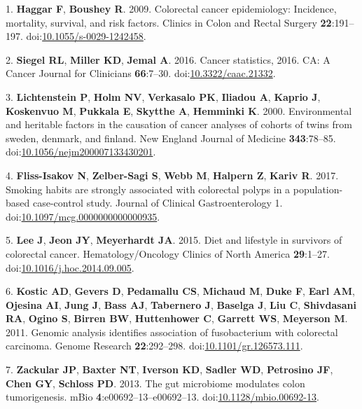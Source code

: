 \documentclass[11pt,]{article}
\begin{document}
\hypertarget{refs}{}
\hypertarget{ref-Haggar2009}{}
1. \textbf{Haggar F}, \textbf{Boushey R}. 2009. Colorectal cancer
epidemiology: Incidence, mortality, survival, and risk factors. Clinics
in Colon and Rectal Surgery \textbf{22}:191--197.
doi:\href{https://doi.org/10.1055/s-0029-1242458}{10.1055/s-0029-1242458}.

\hypertarget{ref-Siegel2016}{}
2. \textbf{Siegel RL}, \textbf{Miller KD}, \textbf{Jemal A}. 2016.
Cancer statistics, 2016. CA: A Cancer Journal for Clinicians
\textbf{66}:7--30.
doi:\href{https://doi.org/10.3322/caac.21332}{10.3322/caac.21332}.

\hypertarget{ref-Lichtenstein2000}{}
3. \textbf{Lichtenstein P}, \textbf{Holm NV}, \textbf{Verkasalo PK},
\textbf{Iliadou A}, \textbf{Kaprio J}, \textbf{Koskenvuo M},
\textbf{Pukkala E}, \textbf{Skytthe A}, \textbf{Hemminki K}. 2000.
Environmental and heritable factors in the causation of cancer analyses
of cohorts of twins from sweden, denmark, and finland. New England
Journal of Medicine \textbf{343}:78--85.
doi:\href{https://doi.org/10.1056/nejm200007133430201}{10.1056/nejm200007133430201}.

\hypertarget{ref-FlissIsakov2017}{}
4. \textbf{Fliss-Isakov N}, \textbf{Zelber-Sagi S}, \textbf{Webb M},
\textbf{Halpern Z}, \textbf{Kariv R}. 2017. Smoking habits are strongly
associated with colorectal polyps in a population-based case-control
study. Journal of Clinical Gastroenterology 1.
doi:\href{https://doi.org/10.1097/mcg.0000000000000935}{10.1097/mcg.0000000000000935}.

\hypertarget{ref-Lee2015}{}
5. \textbf{Lee J}, \textbf{Jeon JY}, \textbf{Meyerhardt JA}. 2015. Diet
and lifestyle in survivors of colorectal cancer. Hematology/Oncology
Clinics of North America \textbf{29}:1--27.
doi:\href{https://doi.org/10.1016/j.hoc.2014.09.005}{10.1016/j.hoc.2014.09.005}.

\hypertarget{ref-Kostic2011}{}
6. \textbf{Kostic AD}, \textbf{Gevers D}, \textbf{Pedamallu CS},
\textbf{Michaud M}, \textbf{Duke F}, \textbf{Earl AM}, \textbf{Ojesina
AI}, \textbf{Jung J}, \textbf{Bass AJ}, \textbf{Tabernero J},
\textbf{Baselga J}, \textbf{Liu C}, \textbf{Shivdasani RA},
\textbf{Ogino S}, \textbf{Birren BW}, \textbf{Huttenhower C},
\textbf{Garrett WS}, \textbf{Meyerson M}. 2011. Genomic analysis
identifies association of fusobacterium with colorectal carcinoma.
Genome Research \textbf{22}:292--298.
doi:\href{https://doi.org/10.1101/gr.126573.111}{10.1101/gr.126573.111}.

\hypertarget{ref-Zackular2013}{}
7. \textbf{Zackular JP}, \textbf{Baxter NT}, \textbf{Iverson KD},
\textbf{Sadler WD}, \textbf{Petrosino JF}, \textbf{Chen GY},
\textbf{Schloss PD}. 2013. The gut microbiome modulates colon
tumorigenesis. mBio \textbf{4}:e00692--13--e00692--13.
doi:\href{https://doi.org/10.1128/mbio.00692-13}{10.1128/mbio.00692-13}.
\end{document}
